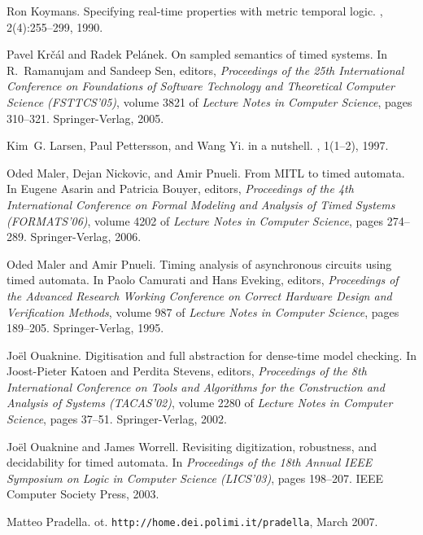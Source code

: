 \documentclass[a4paper]{article}
\newcommand{\zot}{ot}
\theoremstyle{plain}
\theoremstyle{definition}
\begin{document}
\begin{thebibliography}{10}
Ron Koymans.
\newblock Specifying real-time properties with metric temporal logic.
, 2(4):255--299, 1990.

Pavel Kr{\v c}{\' a}l and Radek Pel{\' a}nek.
\newblock On sampled semantics of timed systems.
\newblock In R.~Ramanujam and Sandeep Sen, editors, {\em Proceedings of the
  25th International Conference on Foundations of Software Technology and
  Theoretical Computer Science (FSTTCS'05)}, volume 3821 of {\em Lecture Notes
  in Computer Science}, pages 310--321. Springer-Verlag, 2005.

Kim~G. Larsen, Paul Pettersson, and Wang Yi.
 in a nutshell.
, 1(1--2), 1997.

Oded Maler, Dejan Nickovic, and Amir Pnueli.
\newblock From {MITL} to timed automata.
\newblock In Eugene Asarin and Patricia Bouyer, editors, {\em Proceedings of
  the 4th International Conference on Formal Modeling and Analysis of Timed
  Systems (FORMATS'06)}, volume 4202 of {\em Lecture Notes in Computer
  Science}, pages 274--289. Springer-Verlag, 2006.

Oded Maler and Amir Pnueli.
\newblock Timing analysis of asynchronous circuits using timed automata.
\newblock In Paolo Camurati and Hans Eveking, editors, {\em Proceedings of the
  Advanced Research Working Conference on Correct Hardware Design and
  Verification Methods}, volume 987 of {\em Lecture Notes in Computer Science},
  pages 189--205. Springer-Verlag, 1995.

Jo{\" e}l Ouaknine.
\newblock Digitisation and full abstraction for dense-time model checking.
\newblock In Joost-Pieter Katoen and Perdita Stevens, editors, {\em Proceedings
  of the 8th International Conference on Tools and Algorithms for the
  Construction and Analysis of Systems (TACAS'02)}, volume 2280 of {\em Lecture
  Notes in Computer Science}, pages 37--51. Springer-Verlag, 2002.

Jo{\" e}l Ouaknine and James Worrell.
\newblock Revisiting digitization, robustness, and decidability for timed
  automata.
\newblock In {\em Proceedings of the 18th Annual IEEE Symposium on Logic in
  Computer Science (LICS'03)}, pages 198--207. IEEE Computer Society Press,
  2003.

Matteo Pradella.
\newblock \zot{}.
\newblock \texttt{http://home.dei.polimi.it/pradella}, March 2007.


\end{thebibliography}
\end{document}
